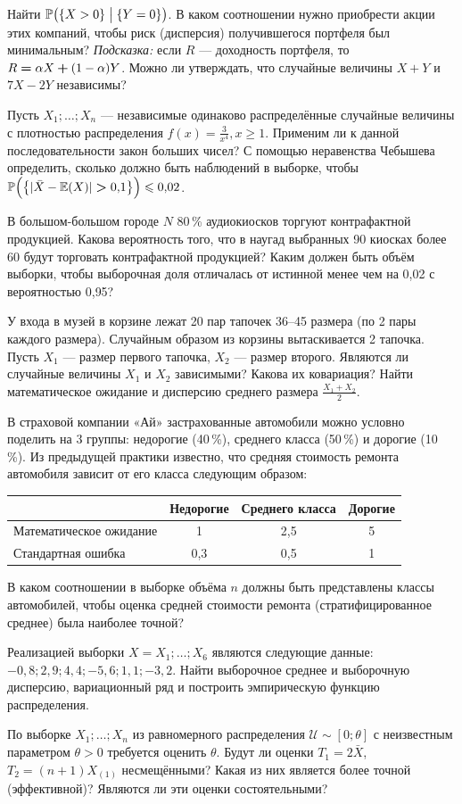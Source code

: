 \documentclass[12pt, a4paper]{article}\usepackage[]{graphicx}\usepackage[]{color}
\newenvironment{enumerate*}{
\begin{enumerate}
  \setlength{\itemsep}{0pt}
  \setlength{\parskip}{0pt}
  \setlength{\parsep}{0pt}
}{\end{enumerate}}
\begin{document}
\begin{enumerate*}
    Найти $\P\bigl( \{X>0\} \bigm| \{Y=0\}\bigr)$. В каком соотношении нужно приобрести акции этих компаний, чтобы риск (дисперсия) получившегося портфеля был минимальным? \emph{Подсказка:} если $R$ — доходность портфеля, то $R\hm=\alpha X\hm+(1-\alpha)Y$. Можно ли утверждать, что случайные величины $X+Y$ и $7X-2Y$ независимы?
\item Пусть $X_1;\ldots;X_n$ — независимые одинаково распределённые случайные величины с плотностью распределения $f(x)=\frac{3}{x^4}, x\geqslant 1$. Применим ли к данной последовательности закон больших чисел? С помощью неравенства Чебышева определить, сколько должно быть наблюдений в выборке, чтобы $\P\Bigl( \big\{ |\bar X -\E(X)|\hm>0{,}1\big\} \Big)\leqslant 0{,}02$.
\item В большом-большом городе $N$ 80\,\% аудиокиосков торгуют контрафактной продукцией. Какова вероятность того, что  в наугад выбранных 90 киосках более 60 будут торговать контрафактной  продукцией? Каким должен быть объём выборки, чтобы выборочная доля отличалась от истинной менее чем на 0{,}02 с вероятностью 0{,}95?
\item У входа в музей в корзине лежат 20 пар тапочек 36--45 размера (по 2 пары каждого размера). Случайным образом из корзины вытаскивается 2 тапочка. Пусть $X_1$ — размер первого тапочка, $X_2$ — размер второго. Являются ли случайные величины $X_1$ и $X_2$ зависимыми? Какова их ковариация? Найти математическое ожидание и дисперсию среднего размера $\frac{X_1+X_2}{2}$.
\item В страховой компании «Ай» застрахованные автомобили можно условно поделить на 3 группы: недорогие (40\,\%), среднего класса (50\,\%) и дорогие (10\,\%). Из предыдущей практики известно, что средняя стоимость ремонта автомобиля зависит от его класса следующим образом:
    \begin{center}
    \begin{tabular}{|l|c|c|c|}
    \hline
    & Недорогие & Среднего класса & Дорогие \\ \hline
    Математическое ожидание & 1 & 2{,}5 & 5 \\ \hline
    Стандартная ошибка & 0{,}3 & 0{,}5 & 1 \\ \hline
    \end{tabular}
    \end{center}
    В каком соотношении в выборке объёма $n$ должны быть представлены классы автомобилей, чтобы оценка средней стоимости ремонта (стратифицированное среднее) была наиболее точной?
\item Реализацией выборки $X=X_1;\ldots;X_6$ являются следующие данные: $-0{,}8;2{,}9;4{,}4;-5{,}6;1{,}1;-3{,}2$. Найти выборочное среднее и выборочную дисперсию, вариационный ряд и построить эмпирическую функцию распределения.
\item По выборке $X_1;\ldots;X_n$ из равномерного распределения $\mathcal{U}\sim[0;\theta]$ с неизвестным параметром $\theta >0$ требуется оценить $\theta$. Будут ли оценки $T_1=2\bar{X}$, $T_2=(n+1)X_{(1)}$ несмещёнными? Какая из них является более точной (эффективной)? Являются ли эти оценки состоятельными?
\end{enumerate*}
\end{document}
